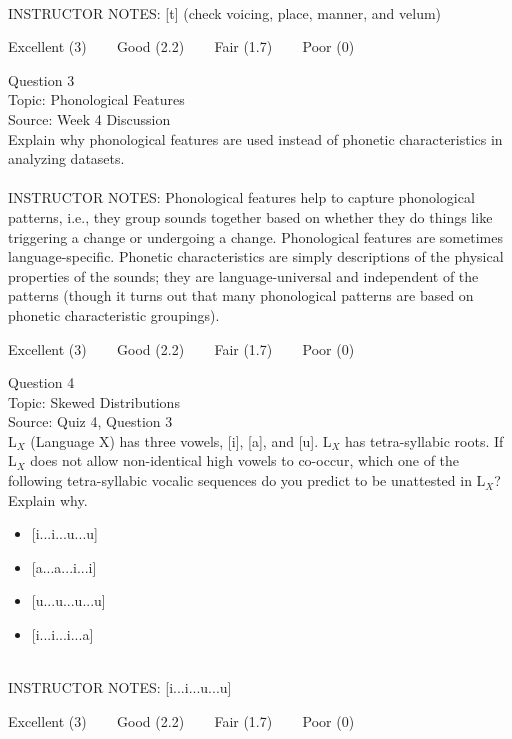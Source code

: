 \documentclass[12pt]{article}
\begin{document}
~\\
INSTRUCTOR NOTES: [t] (check voicing, place, manner, and velum)


\vfill
Excellent (3) ~~~ Good (2.2) ~~~ Fair (1.7) ~~~ Poor (0)
\newpage

{\large Question 3}\\

Topic: Phonological Features\\
Source: Week 4 Discussion\\

Explain why phonological features are used instead of phonetic characteristics in analyzing datasets.\\


~\\
INSTRUCTOR NOTES: Phonological features help to capture phonological patterns, i.e., they group sounds together based on whether they do things like triggering a change or undergoing a change. Phonological features are sometimes language-specific. Phonetic characteristics are simply descriptions of the physical properties of the sounds; they are language-universal and independent of the patterns (though it turns out that many phonological patterns are based on phonetic characteristic groupings).


\vfill
Excellent (3) ~~~ Good (2.2) ~~~ Fair (1.7) ~~~ Poor (0)
\newpage

{\large Question 4}\\

Topic: Skewed Distributions\\
Source: Quiz 4, Question 3\\

L$_X$ (Language X) has three vowels, [i], [a], and [u]. L$_X$ has tetra-syllabic roots. If L$_X$ does not allow non-identical high vowels to co-occur, which one of the following tetra-syllabic vocalic sequences do you predict to be unattested in L$_X$? Explain why.\\

\begin{itemize} \item {[i...i...u...u]} \item {[a...a...i...i]} \item {[u...u...u...u]} \item {[i...i...i...a]} \end{itemize}


~\\
INSTRUCTOR NOTES: [i...i...u...u]


\vfill
Excellent (3) ~~~ Good (2.2) ~~~ Fair (1.7) ~~~ Poor (0)
\newpage
\end{document}
